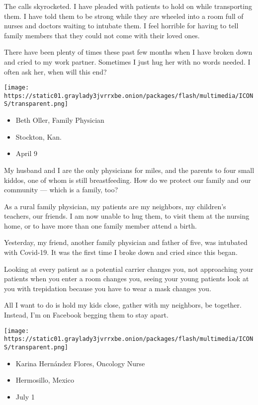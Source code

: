 The calls skyrocketed. I have pleaded with patients to hold on while
transporting them. I have told them to be strong while they are wheeled
into a room full of nurses and doctors waiting to intubate them. I feel
horrible for having to tell family members that they could not come with
their loved ones.

There have been plenty of times these past few months when I have broken
down and cried to my work partner. Sometimes I just hug her with no
words needed. I often ask her, when will this end?

\texttt{[image: https://static01.graylady3jvrrxbe.onion/packages/flash/multimedia/ICONS/transparent.png]}

\begin{itemize}
\tightlist
\item
  Beth Oller, Family Physician
\item
  Stockton, Kan.
\item
  April 9
\end{itemize}

My husband and I are the only physicians for miles, and the parents to
four small kiddos, one of whom is still breastfeeding. How do we protect
our family and our community --- which is a family, too?

As a rural family physician, my patients are my neighbors, my children's
teachers, our friends. I am now unable to hug them, to visit them at the
nursing home, or to have more than one family member attend a birth.

Yesterday, my friend, another family physician and father of five, was
intubated with Covid-19. It was the first time I broke down and cried
since this began.

Looking at every patient as a potential carrier changes you, not
approaching your patients when you enter a room changes you, seeing your
young patients look at you with trepidation because you have to wear a
mask changes you.

All I want to do is hold my kids close, gather with my neighbors, be
together. Instead, I'm on Facebook begging them to stay apart.

\texttt{[image: https://static01.graylady3jvrrxbe.onion/packages/flash/multimedia/ICONS/transparent.png]}

\begin{itemize}
\tightlist
\item
  Karina Hernández Flores, Oncology Nurse
\item
  Hermosillo, Mexico
\item
  July 1
\end{itemize}

